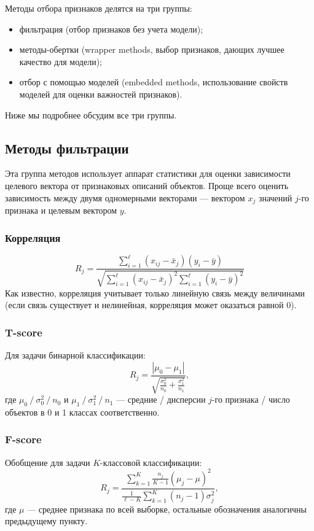 \documentclass[12pt,a4paper]{article}
\begin{document}
	Методы отбора признаков делятся на три группы:
	\begin{itemize}
		\item фильтрация (отбор признаков без учета модели);
		\item методы-обертки (wrapper methods, выбор признаков, дающих лучшее качество для модели);
		\item отбор с помощью моделей (embedded methods, использование свойств моделей для оценки важностей признаков).
	\end{itemize}
   
   Ниже мы подробнее обсудим все три группы.
  
	\par 
	\subsection{Методы фильтрации}
	Эта группа методов использует аппарат статистики для оценки зависимости целевого вектора от признаковых описаний объектов. Проще всего оценить зависимость между двумя одномерными векторами --- вектором $x_j$ значений $j$-го признака и целевым вектором $y$.
	\subsubsection{Корреляция}
	\[
	R_j = \frac{\sum_{i=1}^\ell (x_{ij}-\bar x_j)(y_i - \bar y) }{\sqrt{\sum_{i=1}^\ell (x_{ij}-\bar x_j)^2\sum_{i=1}^\ell (y_i - \bar y)^2}  }
	\]
	Как известно, корреляция учитывает только линейную связь между величинами (если связь существует и нелинейная, корреляция может оказаться равной 0).
	\subsubsection{T-score}
	Для задачи бинарной классификации:
	\[
	R_j = \frac {|\mu_0 - \mu_1|} {\sqrt{\frac {\sigma_0^2}{n_0} + \frac {\sigma_1^2}{n_1} }},
	\]
	где $\mu_0 ~/~ \sigma^2_0~/~n_0$  и $\mu_1 ~/~ \sigma^2_1~/~n_1$ --- средние / дисперсии $j$-го признака / число объектов в 0 и 1 классах соответственно.
		\subsubsection{F-score}
	Обобщение для задачи $K$-классовой классификации:
	\[
	R_j = \frac {\sum_{k=1}^K \frac {n_j}{K-1} (\mu_j - \mu)^2}   {\frac 1 {\ell-K} \sum_{k=1}^K (n_j -1) \sigma_j^2},
	\]
	где $\mu$ --- среднее признака по всей выборке, остальные обозначения аналогичны предыдущему пункту.
	
\end{document}
